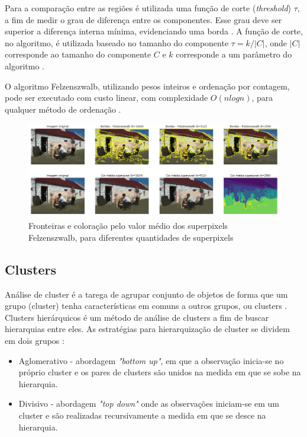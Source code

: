 \begin{document}
Para a comparação entre as regiões é utilizada uma função de corte (\textit{threshold}) $\tau$, a fim de medir o grau de diferença entre os componentes. Esse grau deve ser superior a diferença interna mínima, evidenciando uma borda \cite{FELZENSZWALB}. A função de corte, no algoritmo, é utilizada baseado no tamanho do componente $\tau=k/|C|$, onde $|C|$ corresponde ao tamanho do componente $C$ e $k$ corresponde a um parâmetro do algoritmo \cite{FELZENSZWALB}.

O algoritmo Felzenszwalb, utilizando pesos inteiros e ordenação por contagem, pode ser executado com custo linear, com complexidade $O(nlogn)$, para qualquer método de ordenação \cite{FELZENSZWALB}.

\begin{figure}[ht]
\centering
\includegraphics[width=1.\textwidth]{felz_segmentation_compare.png}
\caption{Fronteiras e coloração pelo valor médio dos superpixels Felzenszwalb, para diferentes quantidades de superpixels}
\label{alg:SLIC}
\end{figure}


\subsection{Clusters} \label{sssec:clusters}

Análise de cluster é a tarega de agrupar conjunto de objetos de forma que um grupo (cluster) tenha características em comuns a outros grupos, ou clusters \cite{WIKI_CLUSTER_ANALYSIS}. Clusters hierárquicos é um método de análise de clusters a fim de buscar hierarquias entre eles. As estratégias para hierarquização de cluster se dividem em dois grupos \cite{ROKACH}:

\begin{itemize}
 \item Aglomerativo - abordagem \textit{"bottom up"}, em que a observação inicia-se no próprio cluster e os pares de clusters são unidos na medida em que se sobe na hierarquia. 
 \item Divisivo - abordagem \textit{"top down"} onde as observações iniciam-se em um cluster e são realizadas recursivamente a medida em que se desce na hierarquia.
\end{itemize}
\end{document}
